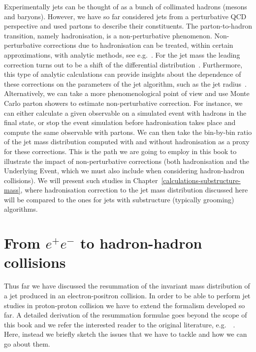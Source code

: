 Experimentally jets can be thought of as a bunch of collimated hadrons
(mesons and baryons). However, we have so far considered jets from a
perturbative QCD perspective and used partons to describe their constituents. 
%
%
The parton-to-hadron transition, namely hadronisation, is a
non-perturbative phenomenon.
%
Non-perturbative corrections due to hadronisation can be treated,
within certain approximations, with analytic methods, see
e.g.~\cite{Lee:2006fn,Stewart:2014nna}. For the jet mass the leading correction turns
out to be a shift of the differential
distribution~\cite{Dokshitzer:1997ew,Salam:2001bd}. Furthermore, this type of analytic calculations can provide insights about the dependence of these corrections on the parameters of the jet algorithm, such as the jet radius~\cite{Dasgupta:2007wa}.
%
Alternatively, we can take a more phenomenological point of view and
use Monte Carlo parton showers to estimate non-perturbative
correction. For instance, we can either calculate a given observable
on a simulated event with hadrons in the final state, or stop the
event simulation before hadronisation takes place and compute the same
observable with partons. We can then take the bin-by-bin ratio of the
jet mass distribution computed with and without hadronisation as a
proxy for these corrections.
%
This is the path we are going to employ in this book to illustrate the
impact of non-perturbative corrections (both hadronisation and the
Underlying Event, which we must also include when considering hadron-hadron collisions).
%
 We will present such studies in
Chapter~\ref{calculations-substructure-mass}, where hadronisation
correction to the jet mass distribution discussed here will be
compared to the ones for jets with substructure (typically grooming)
algorithms.




\section{From $e^+e^-$ to hadron-hadron collisions}\label{sec:pp-collisions}

Thus far we have discussed the resummation of the invariant mass distribution of a jet produced in an electron-positron collision. In order to be able to perform jet studies in proton-proton collision we have to extend the formalism developed so far. A detailed derivation of the resummation formulae goes beyond the scope of this book and we refer the interested reader to the original literature, e.g.\ ~\cite{Catani:1996yz,Kidonakis:1998nf}. Here, instead we briefly sketch the issues that we have to tackle and how we can go about them.

